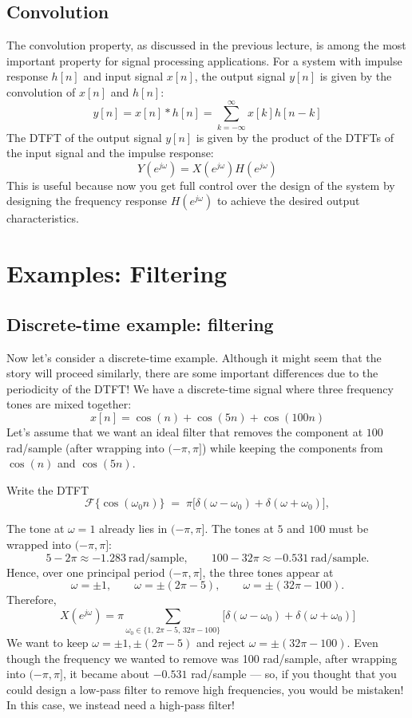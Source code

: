 \subsection{Convolution}
The convolution property, as discussed in the previous lecture, is among the most important property for signal processing applications. For a system with impulse response \( h[n] \) and input signal \( x[n] \), the output signal \( y[n] \) is given by the convolution of \( x[n] \) and \( h[n] \):
\[y[n] = x[n] * h[n] = \sum_{k=-\infty}^{\infty} x[k] h[n - k]\]
The DTFT of the output signal \( y[n] \) is given by the product of the DTFTs of the input signal and the impulse response:
\[Y(e^{j \omega}) = X(e^{j \omega}) H(e^{j \omega})\]
This is useful because now you get full control over the design of the system by designing the frequency response \( H(e^{j \omega}) \) to achieve the desired output characteristics.

\section{Examples: Filtering}
\subsection{Discrete-time example: filtering}
Now let's consider a discrete-time example. Although it might seem that the story will proceed similarly, there are some important differences due to the periodicity of the DTFT! We have a discrete-time signal where three frequency tones are mixed together:
\[
x[n] = \cos(n) + \cos(5n) + \cos(100n)
\]
Let's assume that we want an ideal filter that removes the component at $100$ rad/sample (after wrapping into $(-\pi,\pi]$) while keeping the components from $\cos(n)$ and $\cos(5n)$.

Write the DTFT
\[
\mathcal{F}\{\cos(\omega_0 n)\} \;=\; \pi\big[\delta(\omega-\omega_0)+\delta(\omega+\omega_0)\big],
\]

The tone at $\omega=1$ already lies in $(-\pi,\pi]$. The tones at $5$ and $100$ must be wrapped into $(-\pi,\pi]$:
\[
5-2\pi\approx-1.283\ \text{rad/sample},\qquad 100-32\pi\approx-0.531\ \text{rad/sample}.
\]
Hence, over one principal period $(-\pi,\pi]$, the three tones appear at
\[
\omega=\pm 1,\qquad \omega=\pm(2\pi-5),\qquad \omega=\pm(32\pi-100).
\]
Therefore,
\[
X(e^{j\omega})
=\pi\sum_{\omega_0\in\{1,\,2\pi-5,\,32\pi-100\}}
\big[\delta(\omega-\omega_0)+\delta(\omega+\omega_0)\big]
\]
We want to keep $\omega=\pm 1,\pm(2\pi-5)$ and reject $\omega=\pm(32\pi-100)$. Even though the frequency we wanted to remove was 100 rad/sample, after wrapping into $(-\pi,\pi]$, it became about $-0.531$ rad/sample --- so, if you thought that you could design a low-pass filter to remove high frequencies, you would be mistaken! In this case, we instead need a high-pass filter! 

